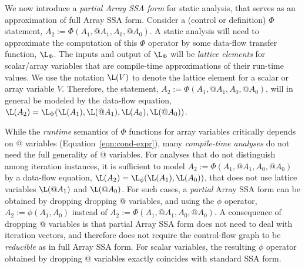 We now introduce a {\it partial Array SSA form} for static analysis,
that serves as an approximation of full Array SSA form.
Consider a (control or definition) $\Phi$ statement, $A_2 := \Phi(A_1, @A_1, A_0, @A_0)$.
A static analysis will need to 
approximate
the computation of this $\Phi$ operator by 
some data-flow transfer function, $\L_{\Phi}$.
The inputs and output of $\L_{\Phi}$ will be
{\it lattice elements} for scalar/array variables that
are compile-time approximations of their run-time values.
We use the notation $\L(V)$ to denote the lattice element for 
a scalar or array
variable $V$.
Therefore, the 
statement, $A_2 := \Phi(A_1, @A_1, A_0, @A_0)$, will in general
be modeled by the data-flow equation,
$\L(A_2) = \L_{\Phi}(\L(A_1), \L(@A_1), \L(A_0), \L(@A_0))$.

While the  {\em runtime} semantics of 
$\Phi$ functions for array variables critically depends on @ variables (Equation~\ref{eqn:cond-expr}),
many {\em compile-time analyses} do not need the full generality of @ variables.  
For analyses that do not distinguish among iteration instances,
it is sufficient to model
$A_2 := \Phi(A_1, @A_1, A_0, @A_0)$ by
a data-flow equation, $\L(A_2) = \L_{\phi}(\L(A_1), \L(A_0))$,
that does not use lattice variables $\L(@A_1)$ and $\L(@A_0)$.
For such cases, a {\it partial}
Array SSA form can be obtained by dropping 
dropping @ variables, and using the
$\phi$ operator, $A_2 := \phi(A_1, A_0)$ instead of
$A_2 := \Phi(A_1, @A_1, A_0, @A_0)$.  
A consequence of dropping @ variables is that partial Array
SSA form does not need to deal with iteration
vectors, and therefore does not require the control-flow graph to be {\it reducible} as in full Array SSA form.
For scalar variables, the resulting $\phi$ operator obtained by
dropping @ variables exactly coincides with standard SSA form.




